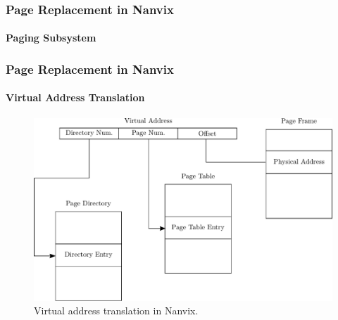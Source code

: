 \documentclass{beamer}
\begin{document}
	\begin{frame}
	\frametitle{Page Replacement in Nanvix}
	\framesubtitle{Paging Subsystem}
		\begin{itemize}
		\setlength\itemsep{1.5em}
		\end{itemize}
	\end{frame}

	\begin{frame}
	\frametitle{Page Replacement in Nanvix}
	\framesubtitle{Virtual Address Translation}
		\begin{figure}
			\centering
			\includegraphics[width=0.9\linewidth]{paging}
			\caption{Virtual address translation in Nanvix.}
		\end{figure}
	\end{frame}
\end{document}
